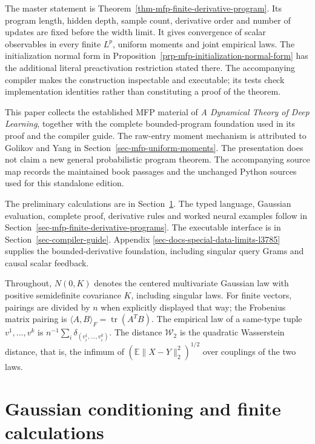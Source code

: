 \documentclass[
  11pt,
]{article}
\theoremstyle{definition}
\theoremstyle{plain}
\theoremstyle{plain}
\theoremstyle{plain}
\theoremstyle{remark}
\begin{document}
The master statement is Theorem~\ref{thm-mfp-finite-derivative-program}.
Its program length, hidden depth, sample count, derivative order and
number of updates are fixed before the width limit. It gives convergence
of scalar observables in every finite \(L^p\), uniform moments and joint
empirical laws. The initialization normal form in
Proposition~\ref{prp-mfp-initialization-normal-form} has the additional
literal preactivation restriction stated there. The accompanying
compiler makes the construction inspectable and executable; its tests
check implementation identities rather than constituting a proof of the
theorem.

This paper collects the established MFP material of \emph{A Dynamical
Theory of Deep Learning}, together with the complete bounded-program
foundation used in its proof and the compiler guide. The raw-entry
moment mechanism is attributed to Golikov and Yang in
Section~\ref{sec-mfp-uniform-moments}. The presentation does not claim a
new general probabilistic program theorem. The accompanying source map
records the maintained book passages and the unchanged Python sources
used for this standalone edition.

The preliminary calculations are in Section~\ref{sec-preliminaries}. The
typed language, Gaussian evaluation, complete proof, derivative rules
and worked neural examples follow in
Section~\ref{sec-mfp-finite-derivative-programs}. The executable
interface is in Section~\ref{sec-compiler-guide}. Appendix
\ref{sec-docs-special-data-limits-l3785} supplies the bounded-derivative
foundation, including singular query Grams and causal scalar feedback.

Throughout, \(N(0,K)\) denotes the centered multivariate Gaussian law
with positive semidefinite covariance \(K\), including singular laws.
For finite vectors, pairings are divided by \(n\) when explicitly
displayed that way; the Frobenius matrix pairing is
\(\langle A,B\rangle_F=\operatorname{tr}(A^TB)\). The empirical law of a
same-type tuple \(v^1,\ldots,v^k\) is
\(n^{-1}\sum_i\delta_{(v^1_i,\ldots,v^k_i)}\). The distance
\(\mathcal W_2\) is the quadratic Wasserstein distance, that is, the
infimum of \((\mathbb E\|X-Y\|_2^2)^{1/2}\) over couplings of the two
laws.

\section{Gaussian conditioning and finite
calculations}\label{sec-preliminaries}
\end{document}
